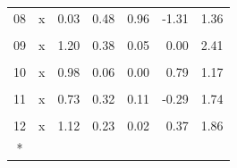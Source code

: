 \begin{longtable}[t]{ccrrrrr}
08 & x & 0.03 & 0.48 & 0.96 & -1.31 & 1.36\\
\cellcolor{gray!10}{09} & \cellcolor{gray!10}{(Intercept)} & \cellcolor{gray!10}{29415.60} & \cellcolor{gray!10}{22091.39} & \cellcolor{gray!10}{0.28} & \cellcolor{gray!10}{-40889.05} & \cellcolor{gray!10}{99720.24}\\
09 & x & 1.20 & 0.38 & 0.05 & 0.00 & 2.41\\
\cellcolor{gray!10}{10} & \cellcolor{gray!10}{(Intercept)} & \cellcolor{gray!10}{15570.19} & \cellcolor{gray!10}{2424.35} & \cellcolor{gray!10}{0.01} & \cellcolor{gray!10}{7854.82} & \cellcolor{gray!10}{23285.56}\\
10 & x & 0.98 & 0.06 & 0.00 & 0.79 & 1.17\\
\cellcolor{gray!10}{11} & \cellcolor{gray!10}{(Intercept)} & \cellcolor{gray!10}{18712.99} & \cellcolor{gray!10}{8019.65} & \cellcolor{gray!10}{0.10} & \cellcolor{gray!10}{-6809.11} & \cellcolor{gray!10}{44235.09}\\
11 & x & 0.73 & 0.32 & 0.11 & -0.29 & 1.74\\
\cellcolor{gray!10}{12} & \cellcolor{gray!10}{(Intercept)} & \cellcolor{gray!10}{6893.51} & \cellcolor{gray!10}{2872.76} & \cellcolor{gray!10}{0.10} & \cellcolor{gray!10}{-2248.91} & \cellcolor{gray!10}{16035.92}\\
12 & x & 1.12 & 0.23 & 0.02 & 0.37 & 1.86\\*
\end{longtable}
